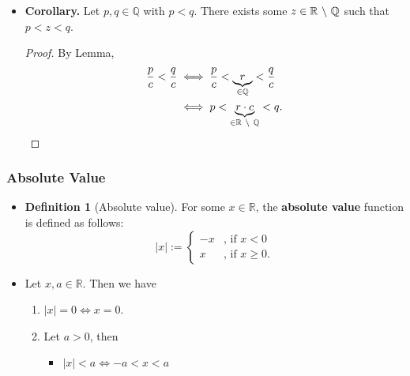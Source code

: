 \documentclass{article}
\newcommand{\Q}{\mathbb{Q}}
\newcommand{\R}{\mathbb{R}}
\newcommand{\?}{\stackrel{?}{=}}
\newcommand{\smallblacksquare}{\rule{0.5em}{0.5em}}
\theoremstyle{definition} %
\newtheorem{definition}[subsection]{Definition} %
\begin{document}
\begin{itemize}
\begin{proof}
\begin{align*}
            &\leq \frac{nx + 1}{n} \\
            &= x + \frac{1}{n} \\
            &= x + y - x \\
            &< y.
        \end{align*}
    \end{proof}
    \item \textbf{Corollary.} Let $p, q \in \Q$ with $p < q$. There exists some $z \in \R \ \symbol{92} \ \Q$ such that $p < z < q$.
    \begin{proof}
        By Lemma,
        \begin{align*}
            \frac{p}{c} < \frac{q}{c} &\iff \frac{p}{c} < \underbrace{r}_{\in \Q} < \frac{q}{c} \\
            &\iff p < \underbrace{r \cdot c}_{\in \R \ \symbol{92} \ \Q} < q.
        \end{align*}
    \end{proof}
\end{itemize}

\subsubsection{Absolute Value}

\begin{itemize}
    \item[]
    \begin{definition}[Absolute value]
        For some $x \in \R$, the \textbf{absolute value} function is defined as follows:
    \[ |x| := \begin{cases}
        -x & \text{, if } x < 0 \\
        x & \text{, if } x \geq 0.
    \end{cases} \]
    \end{definition}
    \item[]
    \begin{proposition}
        Let $x, a \in \R$. Then we have
    \begin{enumerate}[label=(\roman*)]
        \item $|x| = 0 \iff x = 0$.
        \item Let $a > 0$, then
        \begin{itemize}[label=\smallblacksquare]
            \item $|x| < a \iff -a < x < a$
        \end{itemize}
    \end{enumerate}
    \end{proposition}
\end{itemize}
\end{document}
